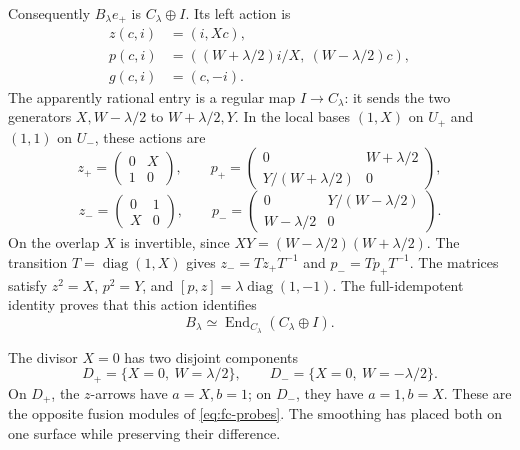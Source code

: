 Consequently \(B_\lambda e_+\) is \(C_\lambda\oplus I\).
Its left action is
\begin{equation}\label{eq:cs-bundle-action}
 \begin{split}
 z(c,i)&=(i,Xc),\\
 p(c,i)&=((W+\lambda/2)i/X,\ (W-\lambda/2)c),\\
 g(c,i)&=(c,-i).
 \end{split}
\end{equation}
The apparently rational entry is a regular map \(I\to C_\lambda\):
it sends the two generators \(X,W-\lambda/2\) to
\(W+\lambda/2,Y\). In the local bases \((1,X)\) on \(U_+\)
and \((1,1)\) on \(U_-\), these actions are
\[
 z_+=\begin{pmatrix}0&X\\1&0\end{pmatrix},\qquad
 p_+=\begin{pmatrix}0&W+\lambda/2\\Y/(W+\lambda/2)&0\end{pmatrix},
\]
\[
 z_-=\begin{pmatrix}0&1\\X&0\end{pmatrix},\qquad
 p_-=\begin{pmatrix}0&Y/(W-\lambda/2)\\W-\lambda/2&0\end{pmatrix}.
\]
On the overlap \(X\) is invertible, since
\(XY=(W-\lambda/2)(W+\lambda/2)\).
The transition \(T=\operatorname{diag}(1,X)\) gives
\(z_-=Tz_+T^{-1}\) and \(p_-=Tp_+T^{-1}\).
The matrices satisfy \(z^2=X\), \(p^2=Y\), and
\([p,z]=\lambda\operatorname{diag}(1,-1)\).
The full-idempotent identity proves that this action identifies
\[
 B_\lambda\simeq\operatorname{End}_{C_\lambda}(C_\lambda\oplus I).
\]

The divisor \(X=0\) has two disjoint components
\[
 D_+=\{X=0,\ W=\lambda/2\},\qquad
 D_-=\{X=0,\ W=-\lambda/2\}.
\]
On \(D_+\), the \(z\)-arrows have \(a=X,b=1\); on \(D_-\), they
have \(a=1,b=X\). These are the opposite fusion modules
of \eqref{eq:fc-probes}. The smoothing has placed both on one
surface while preserving their difference.

